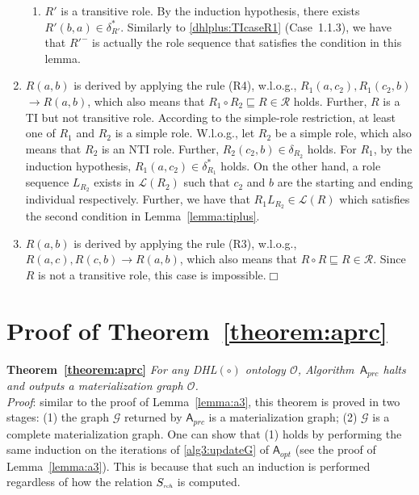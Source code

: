\documentclass[final,1p,times]{elsarticle}
\begin{document}
\begin{enumerate}[leftmargin=12ex,label=Case~3.\arabic*, ref=Case~3.\arabic*]
\begin{enumerate}[leftmargin=8ex,label=Case~3.2.\arabic*]
     \item $R'$ is a transitive role.
        By the induction hypothesis, there exists $R'(b,a)\in\delta^*_{R'}$.
        Similarly to \ref{dhlplus:TIcaseR1} (Case~1.1.3), we have that
        $R'^-$ is actually the role sequence that satisfies the condition
        in this lemma.
    \end{enumerate}

\item $R(a,b)$ is derived by applying the rule (R4), w.l.o.g.,
    $R_1(a,c_2),R_1(c_2,b)$ $\rightarrow R(a,b)$,
    which also means that $R_1\circ R_2\sqsubseteq R\in\mathcal{R}$ holds.
    Further, $R$ is a TI but not transitive role. According to the simple-role restriction,
    at least one of $R_1$ and $R_2$ is a simple role.
    W.l.o.g., let $R_2$ be a simple role, which also
    means that $R_2$ is an NTI role. Further, $R_2(c_2,b)\in\delta_{R_2}$ holds.
    For $R_1$, by the induction hypothesis, $R_1(a,c_2)\in\delta^*_{R_1}$ holds.
    On the other hand, a role sequence $L_{R_2}$ exists in $\mathcal{L}(R_2)$ such that $c_2$ and $b$
    are the starting and ending individual respectively.
    Further, we have that $R_1L_{R_2}\in\mathcal{L}(R)$ which satisfies the second condition
    in Lemma~\ref{lemma:tiplus}.\label{dhlplus:TIcaseR4}

\item $R(a,b)$ is derived by applying the rule (R3), w.l.o.g., $R(a,c),R(c,b)\rightarrow R(a,b)$,
    which also means that $R\circ R\sqsubseteq R\in\mathcal{R}$.
    Since $R$ is not a transitive role, this case is impossible.\hfill$\Box$
\end{enumerate}

\section{Proof of Theorem~\ref{theorem:aprc}}

\textbf{Theorem~\ref{theorem:aprc}}
\emph{For any DHL$(\circ)$ ontology $\mathcal{O}$, Algorithm~$\mathsf{A}_{prc}$ halts and outputs
a materialization graph $\mathcal{O}$.}\\

\noindent\emph{Proof}: similar to the proof of Lemma~\ref{lemma:a3},
this theorem is proved in two stages:
(1) the graph $\mathcal{G}$ returned by $\mathsf{A}_{prc}$ is a materialization graph;
(2) $\mathcal{G}$ is a complete materialization graph.
One can show that (1) holds by performing the same induction on the iterations of \ref{alg3:updateG} of $\mathsf{A}_{opt}$
(see the proof of Lemma~\ref{lemma:a3}). This is because that
such an induction is performed regardless of how the relation $S_{\textit{\tiny rch}}$ is computed.
\end{document}
